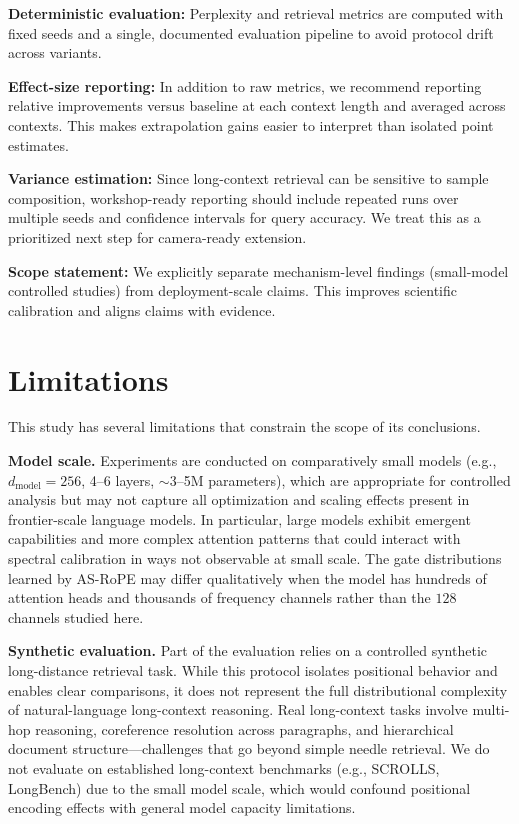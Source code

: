 \documentclass[conference]{IEEEtran}
\begin{document}
\textbf{Deterministic evaluation:} Perplexity and retrieval metrics are computed with fixed seeds and a single, documented evaluation pipeline to avoid protocol drift across variants.

\textbf{Effect-size reporting:} In addition to raw metrics, we recommend reporting relative improvements versus baseline at each context length and averaged across contexts. This makes extrapolation gains easier to interpret than isolated point estimates.

\textbf{Variance estimation:} Since long-context retrieval can be sensitive to sample composition, workshop-ready reporting should include repeated runs over multiple seeds and confidence intervals for query accuracy. We treat this as a prioritized next step for camera-ready extension.

\textbf{Scope statement:} We explicitly separate mechanism-level findings (small-model controlled studies) from deployment-scale claims. This improves scientific calibration and aligns claims with evidence.

\section{Limitations}
This study has several limitations that constrain the scope of its conclusions.

\textbf{Model scale.} Experiments are conducted on comparatively small models (e.g., $d_{\text{model}}=256$, 4--6 layers, $\sim$3--5M parameters), which are appropriate for controlled analysis but may not capture all optimization and scaling effects present in frontier-scale language models. In particular, large models exhibit emergent capabilities and more complex attention patterns that could interact with spectral calibration in ways not observable at small scale. The gate distributions learned by AS-RoPE may differ qualitatively when the model has hundreds of attention heads and thousands of frequency channels rather than the $128$ channels studied here.

\textbf{Synthetic evaluation.} Part of the evaluation relies on a controlled synthetic long-distance retrieval task. While this protocol isolates positional behavior and enables clear comparisons, it does not represent the full distributional complexity of natural-language long-context reasoning. Real long-context tasks involve multi-hop reasoning, coreference resolution across paragraphs, and hierarchical document structure---challenges that go beyond simple needle retrieval. We do not evaluate on established long-context benchmarks (e.g., SCROLLS, LongBench) due to the small model scale, which would confound positional encoding effects with general model capacity limitations.
\end{document}
